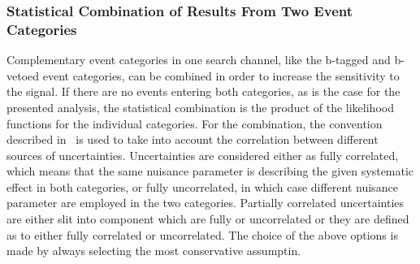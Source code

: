 \subsubsection{Statistical Combination of Results From Two Event Categories}
Complementary event categories in one search channel, 
like the b-tagged and b-vetoed event categories, 
can be combined in order to increase the
sensitivity to the signal. If there are no events entering both categories, as is the case for  the presented analysis,
the statistical combination is the product of the likelihood
functions for the individual categories. For the combination, the  convention described in~\cite{lhclimits} is used
to take into account the correlation between different sources of uncertainties.
Uncertainties are considered either as fully correlated, which means that the same nuisance parameter
is describing the given systematic effect in both categories,  or fully uncorrelated, in which case different nuisance parameter are
employed in the two categories. Partially correlated uncertainties are either slit into component which are fully
or uncorrelated or they are defined as  to either fully correlated or uncorrelated.
The choice of the above options is made by always selecting the most conservative assumptin.



